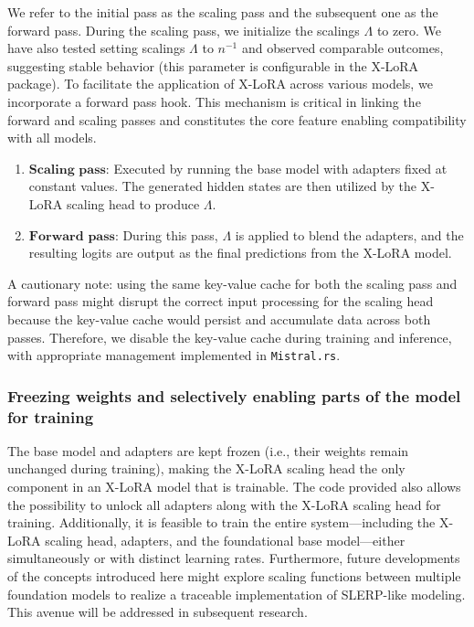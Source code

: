 We refer to the initial pass as the scaling pass and the subsequent one as the forward pass. During the scaling pass, we initialize the scalings $\Lambda$ to zero. We have also tested setting scalings $\Lambda$ to ${n}^{-1}$ and observed comparable outcomes, suggesting stable behavior (this parameter is configurable in the X-LoRA package). To facilitate the application of X-LoRA across various models, we incorporate a forward pass hook. This mechanism is critical in linking the forward and scaling passes and constitutes the core feature enabling compatibility with all models.

\begin{enumerate}
    \item $\mathbf{Scaling}$ $\mathbf{pass}$: Executed by running the base model with adapters fixed at constant values. The generated hidden states are then utilized by the X-LoRA scaling head to produce $\Lambda$.
    \item $\mathbf{Forward}$ $\mathbf{pass}$: During this pass, $\Lambda$ is applied to blend the adapters, and the resulting logits are output as the final predictions from the X-LoRA model.
\end{enumerate}

A cautionary note: using the same key-value cache for both the scaling pass and forward pass might disrupt the correct input processing for the scaling head because the key-value cache would persist and accumulate data across both passes. Therefore, we disable the key-value cache during training and inference, with appropriate management implemented in \texttt{Mistral.rs}.

\subsubsection{Freezing weights and selectively enabling parts of the model for training} The base model and adapters are kept frozen (i.e., their weights remain unchanged during training), making the X-LoRA scaling head the only component in an X-LoRA model that is trainable. The code provided also allows the possibility to unlock all adapters along with the X-LoRA scaling head for training. Additionally, it is feasible to train the entire system—including the X-LoRA scaling head, adapters, and the foundational base model—either simultaneously or with distinct learning rates. Furthermore, future developments of the concepts introduced here might explore scaling functions between multiple foundation models to realize a traceable implementation of SLERP-like modeling. This avenue will be addressed in subsequent research.

